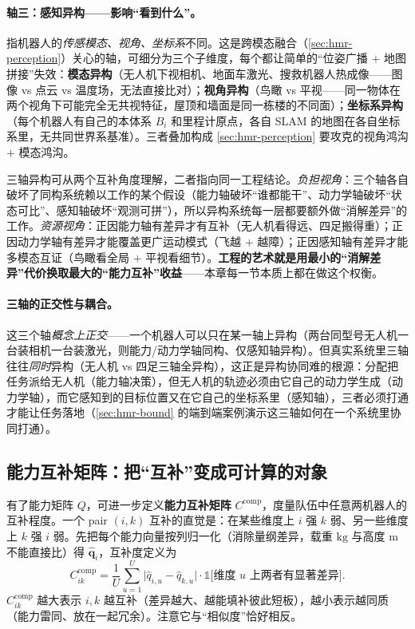 \paragraph{轴三：感知异构——影响“看到什么”。}
指机器人的\emph{传感模态、视角、坐标系}不同。这是跨模态融合（\cref{sec:hmr-perception}）关心的轴，可细分为三个子维度，每个都让简单的“位姿广播 $+$ 地图拼接”失效：\textbf{模态异构}（无人机下视相机、地面车激光、搜救机器人热成像——图像 vs 点云 vs 温度场，无法直接比对）；\textbf{视角异构}（鸟瞰 vs 平视——同一物体在两个视角下可能完全无共视特征，屋顶和墙面是同一栋楼的不同面）；\textbf{坐标系异构}（每个机器人有自己的本体系 $B_i$ 和里程计原点，各自 SLAM 的地图在各自坐标系里，无共同世界系基准）。三者叠加构成 \cref{sec:hmr-perception} 要攻克的视角鸿沟 $+$ 模态鸿沟。

\begin{insight}[异构既是负担又是红利]
三轴异构可从两个互补角度理解，二者指向同一工程结论。\emph{负担视角}：三个轴各自破坏了同构系统赖以工作的某个假设（能力轴破坏“谁都能干”、动力学轴破坏“状态可比”、感知轴破坏“观测可拼”），所以异构系统每一层都要额外做“消解差异”的工作。\emph{资源视角}：正因能力轴有差异才有互补（无人机看得远、四足搬得重）；正因动力学轴有差异才能覆盖更广运动模式（飞越 $+$ 越障）；正因感知轴有差异才能多模态互证（鸟瞰看全局 $+$ 平视看细节）。\textbf{工程的艺术就是用最小的“消解差异”代价换取最大的“能力互补”收益}——本章每一节本质上都在做这个权衡。
\end{insight}

\paragraph{三轴的正交性与耦合。}
这三个轴\emph{概念上正交}——一个机器人可以只在某一轴上异构（两台同型号无人机一台装相机一台装激光，则能力/动力学轴同构、仅感知轴异构）。但真实系统里三轴往往\emph{同时}异构（无人机 vs 四足三轴全异构），这正是异构协同难的根源：分配把任务派给无人机（能力轴决策），但无人机的轨迹必须由它自己的动力学生成（动力学轴），而它感知到的目标位置又在它自己的坐标系里（感知轴），三者必须打通才能让任务落地（\cref{sec:hmr-bound} 的端到端案例演示这三轴如何在一个系统里协同打通）。

\subsection{能力互补矩阵：把“互补”变成可计算的对象}
\label{sec:hmr-comp}
有了能力矩阵 $Q$，可进一步定义\textbf{能力互补矩阵} $C^{\mathrm{comp}}$，度量队伍中任意两机器人的互补程度。一个 pair $(i,k)$ 互补的直觉是：在某些维度上 $i$ 强 $k$ 弱、另一些维度上 $k$ 强 $i$ 弱。先把每个能力向量按列归一化（消除量纲差异，载重 $\mathrm{kg}$ 与高度 $\mathrm{m}$ 不能直接比）得 $\hat{\mathbf{q}}_i$，互补度定义为
\begin{equation}
  C^{\mathrm{comp}}_{ik} = \frac{1}{U}\sum_{u=1}^{U}\big|\hat q_{i,u}-\hat q_{k,u}\big|\cdot\mathbb{1}\big[\text{维度 }u\text{ 上两者有显著差异}\big].
  \label{eq:hmr-comp}
\end{equation}
$C^{\mathrm{comp}}_{ik}$ 越大表示 $i,k$ 越互补（差异越大、越能填补彼此短板），越小表示越同质（能力雷同、放在一起冗余）。注意它与“相似度”恰好相反。

